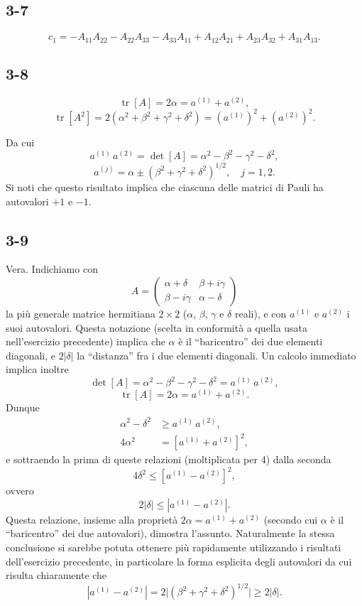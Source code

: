 \documentclass[11pt, a4paper]{book}
\numberwithin{equation}{section}
\begin{document}
\subsection*{3-7}
\[
c_1 = -A_{11}A_{22} - A_{22}A_{33} - A_{33}A_{11}
+ A_{12}A_{21} + A_{23}A_{32} + A_{31}A_{13}.
\]

\subsection*{3-8}
\[
\operatorname{tr}[A] = 2\alpha = a^{(1)}+a^{(2)},
\]
\[
\operatorname{tr}[A^2] = 2(\alpha^2+\beta^2+\gamma^2+\delta^2)
= (a^{(1)})^2 + (a^{(2)})^2.
\]


Da cui
\[
a^{(1)}\,a^{(2)} = \det[A] = \alpha^2-\beta^2-\gamma^2-\delta^2,
\]
\[
a^{(j)} = \alpha \pm (\beta^2+\gamma^2+\delta^2)^{1/2}, \quad j=1,2.
\]
Si noti che questo risultato implica che ciascuna delle matrici di Pauli
ha autovalori $+1$ e $-1$.

\subsection*{3-9}
Vera. Indichiamo con
\[
A = \begin{pmatrix} \alpha+\delta & \beta+i\gamma \\ \beta-i\gamma & \alpha-\delta \end{pmatrix}
\]
la più generale matrice hermitiana $2\times2$ ($\alpha$, $\beta$,
$\gamma$ e $\delta$ reali), e con $a^{(1)}$ e $a^{(2)}$ i suoi
autovalori. Questa notazione (scelta in conformità a quella usata
nell'esercizio precedente) implica che $\alpha$ è il ``baricentro'' dei
due elementi diagonali, e $2|\delta|$ la ``distanza'' fra i due elementi
diagonali. Un calcolo immediato implica inoltre
\[
\det[A] = \alpha^2-\beta^2-\gamma^2-\delta^2 = a^{(1)}\,a^{(2)},
\]
\[
\operatorname{tr}[A] = 2\alpha = a^{(1)}+a^{(2)}.
\]
Dunque
\begin{align*}
\alpha^2-\delta^2 &\geq a^{(1)}\,a^{(2)}, \\
4\alpha^2 &= [a^{(1)}+a^{(2)}]^2,
\end{align*}
e sottraendo la prima di queste relazioni (moltiplicata per 4) dalla
seconda
\[
4\delta^2 \leq [a^{(1)}-a^{(2)}]^2,
\]
ovvero
\[
2|\delta| \leq |a^{(1)}-a^{(2)}|.
\]
Questa relazione, insieme alla proprietà $2\alpha = a^{(1)}+a^{(2)}$
(secondo cui $\alpha$ è il ``baricentro'' dei due autovalori), dimostra
l'assunto. Naturalmente la stessa conclusione si sarebbe potuta ottenere
più rapidamente utilizzando i risultati dell'esercizio precedente, in
particolare la forma esplicita degli autovalori da cui risulta chiaramente
che
\[
|a^{(1)}-a^{(2)}| = 2\bigl|(\beta^2+\gamma^2+\delta^2)^{1/2}\bigr|
\geq 2|\delta|.
\]
\end{document}
